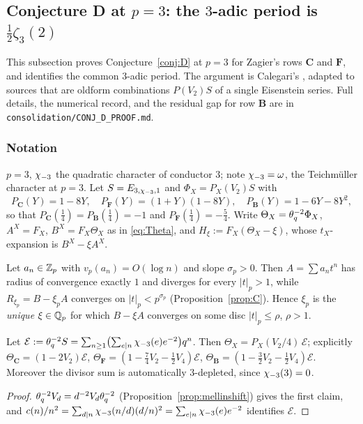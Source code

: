 \subsection{Conjecture D at $p=3$: the $3$-adic period is
$\tfrac12\zeta_3(2)$}\label{sec:conjDproof}

This subsection proves Conjecture~\ref{conj:D} at $p=3$ for Zagier's rows
$\mathbf C$ and $\mathbf F$, and identifies the common $3$-adic period.  The
argument is Calegari's \cite{Cal05}, adapted to sources that are oldform
combinations $P(V_2)S$ of a single Eisenstein series.  Full details, the
numerical record, and the residual gap for row $\mathbf B$ are in
\texttt{consolidation/CONJ\_D\_PROOF.md}.

\subsubsection*{Notation}

$p=3$, $\chi_{-3}$ the quadratic character of conductor $3$; note $\chi_{-3}=\omega$,
the Teichm\"uller character at $p=3$.  Let $S=E_{3,\chi_{-3},1}$ and
$\Phi_X=P_X(V_2)S$ with
\[
P_{\mathbf C}(Y)=1-8Y,\quad P_{\mathbf F}(Y)=(1+Y)(1-8Y),\quad
P_{\mathbf B}(Y)=1-6Y-8Y^2,
\]
so that $P_{\mathbf C}(\tfrac14)=P_{\mathbf B}(\tfrac14)=-1$ and
$P_{\mathbf F}(\tfrac14)=-\tfrac54$.  Write $\Theta_X=\theta_q^{-2}\Phi_X$,
$A^X=F_X$, $B^X=F_X\Theta_X$ as in \eqref{eq:Theta}, and
$H_\xi:=F_X(\Theta_X-\xi)$, whose $t_X$-expansion is $B^X-\xi A^X$.

\begin{lemma}\label{lem:overconv}
\Proved{} Let $a_n\in\mathbb{Z}_p$ with $v_p(a_n)=O(\log n)$ and slope $\sigma_p>0$.  Then
$A=\sum a_nt^n$ has radius of convergence exactly $1$ and diverges for every
$|t|_p>1$, while $R_{\xi_p}=B-\xi_pA$ converges on $|t|_p<p^{\sigma_p}$
\textup{(}Proposition~\ref{prop:C}\textup{)}.  Hence $\xi_p$ is the \emph{unique}
$\xi\in\mathbb{Q}_p$ for which $B-\xi A$ converges on some disc $|t|_p\le\rho$, $\rho>1$.
\end{lemma}

\begin{lemma}\label{lem:Dpx}
\Proved{} Let $\mathcal E:=\theta_q^{-2}S=\sum_{n\ge1}\bigl(\sum_{e\mid n}\chi_{-3}(e)e^{-2}\bigr)q^n$.
Then $\Theta_X=P_X(V_2/4)\,\mathcal E$; explicitly
$\Theta_{\mathbf C}=(1-2V_2)\mathcal E$,
$\Theta_{\mathbf F}=(1-\tfrac74V_2-\tfrac12V_4)\mathcal E$,
$\Theta_{\mathbf B}=(1-\tfrac32V_2-\tfrac12V_4)\mathcal E$.
Moreover the divisor sum is automatically $3$-depleted, since $\chi_{-3}(3)=0$.
\end{lemma}
\begin{proof}
$\theta_q^{-2}V_d=d^{-2}V_d\theta_q^{-2}$ (Proposition~\ref{prop:mellinshift}) gives the
first claim, and $c(n)/n^2=\sum_{d\mid n}\chi_{-3}(n/d)(d/n)^2=\sum_{e\mid n}\chi_{-3}(e)e^{-2}$
identifies $\mathcal E$.
\end{proof}


